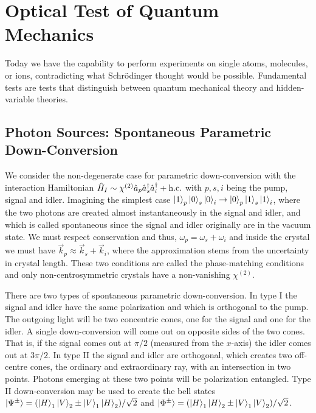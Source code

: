 \section{Optical Test of Quantum Mechanics}
Today we have the capability to perform experiments on single atoms, molecules, or ions, contradicting what Schrödinger thought would be possible. Fundamental tests are tests that distinguish between quantum mechanical theory and hidden-variable theories.

\subsection{Photon Sources: Spontaneous Parametric Down-Conversion}
We consider the non-degenerate case for parametric down-conversion with the interaction Hamiltonian $\hat{H}_I \sim \chi^{(2)}\hat{a}_p \hat{a}^\dagger_s\hat{a}^\dagger_i + \text{h.c.}$ with $p,s,i$ being the pump, signal and idler. Imagining the simplest case $\ket{1}_p\ket{0}_s\ket{0}_i \rightarrow \ket{0}_p\ket{1}_s\ket{1}_i$, where the two photons are created almost instantaneously in the signal and idler, and which is called spontaneous since the signal and idler originally are in the vacuum state. We must respect conservation and thus, $\omega_p = \omega_s + \omega_i$ and inside the crystal we must have $\vec{k}_p \approx \vec{k}_s + \vec{k}_i$, where the approximation stems from the uncertainty in crystal length. These two conditions are called the phase-matching conditions and only non-centrosymmetric crystals have a non-vanishing $\chi^{(2)}$. 

There are two types of spontaneous parametric down-conversion. In type I the signal and idler have the same polarization and which is orthogonal to the pump. The outgoing light will be two concentric cones, one for the signal and one for the idler. A single down-conversion will come out on opposite sides of the two cones. That is, if the signal comes out at $\pi/2$ (measured from the $x$-axis) the idler comes out at $3\pi/2$. In type II the signal and idler are orthogonal, which creates two off-centre cones, the ordinary and extraordinary ray, with an intersection in two points. Photons emerging at these two points will be polarization entangled.  Type II down-conversion may be used to create the bell states $\ket{\Psi^\pm} = (\ket{H}_1 \ket{V}_2 \pm \ket{V}_1 \ket{H}_2)/\sqrt{2}$ and $\ket{\Phi^\pm} = (\ket{H}_1\ket{H}_2 \pm \ket{V}_1\ket{V}_2)/\sqrt{2}$.

